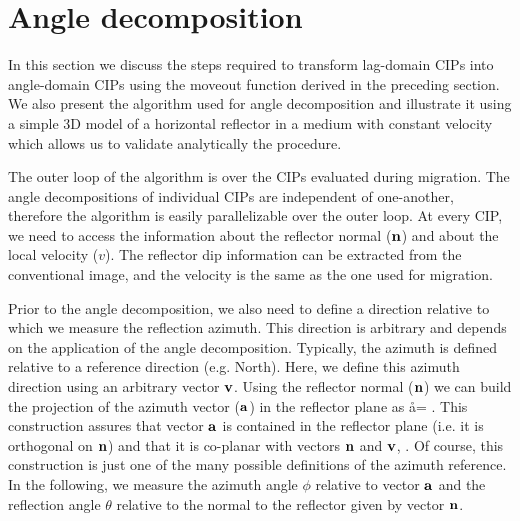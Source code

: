 %
\def\cof{\cos\phi}
\def\sif{\sin\phi}
%

\section{Angle decomposition}

In this section we discuss the steps required to transform lag-domain
CIPs into angle-domain CIPs using the moveout function derived in the
preceding section. We also present the algorithm used for angle
decomposition and illustrate it using a simple 3D model of a
horizontal reflector in a medium with constant velocity which allows
us to validate analytically the procedure.

The outer loop of the algorithm is over the CIPs evaluated during
migration. The angle decompositions of individual CIPs are independent
of one-another, therefore the algorithm is easily parallelizable over
the outer loop. At every CIP, we need to access the information about
the reflector normal ($\nn$) and about the local velocity ($v$). The
reflector dip information can be extracted from the conventional
image, and the velocity is the same as the one used for migration.

Prior to the angle decomposition, we also need to define a direction
relative to which we measure the reflection azimuth. This direction is
arbitrary and depends on the application of the angle
decomposition. Typically, the azimuth is defined relative to a
reference direction (e.g. North). Here, we define this azimuth
direction using an arbitrary vector $\vv$. Using the reflector normal
($\nn$) we can build the projection of the azimuth vector ($\aa$) in
the reflector plane as
%
\beq \label{eqn:AVEC}
\aa = \lp \nn\times\vv \rp \times \nn \;.
\eeq
%
This construction assures that vector $\aa$ is contained in the
reflector plane (i.e. it is orthogonal on $\nn$) and that it is
co-planar with vectors $\nn$ and $\vv$, . Of course, this
construction is just one of the many possible definitions of the
azimuth reference. In the following, we measure the azimuth angle
$\phi$ relative to vector $\aa$ and the reflection angle $\theta$
relative to the normal to the reflector given by vector $\nn$.


